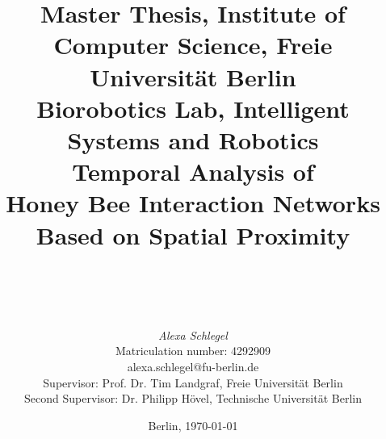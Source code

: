 %
\begin{titlepage}

\title{
{\small Master Thesis, Institute of Computer Science, Freie Universität Berlin}\\
{\small Biorobotics Lab, Intelligent Systems and Robotics}\\
[6ex]
{\LARGE Temporal Analysis of\\ Honey Bee Interaction Networks\\Based on Spatial Proximity\\}
\vspace{2ex}
\\
}

\author{
{\emph{\normalsize Alexa Schlegel}}\\
{\normalsize Matriculation number: 4292909}\\
{\normalsize alexa.schlegel@fu-berlin.de}\\ 
[15ex]   
{\normalsize Supervisor: Prof. Dr. Tim Landgraf, Freie Universität Berlin}\\
{\normalsize Second Supervisor: Dr. Philipp Hövel, Technische Universität Berlin}\\
}
\vspace{6ex}
\date{\normalsize Berlin, \today}
 
\maketitle  


\end{titlepage}